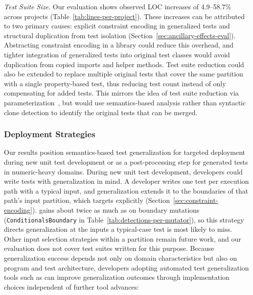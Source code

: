 \textit{Test Suite Size.}
Our evaluation shows observed LOC increases of 4.9--58.7\% across projects
(Table~\ref{tab:lines-per-project}).
These increases can be attributed to two primary causes:
explicit constraint encoding in generalized tests
and structural duplication from test isolation
(Section~\ref{sec:ancillary-effects-eval}).
Abstracting constraint encoding in a library
could reduce this overhead,
and tighter integration of generalized tests into original test classes
would avoid duplication from copied imports and helper methods.
Test suite reduction could also be extended
to replace multiple original tests that cover the same partition
with a single property-based test,
thus reducing test count instead of only compensating for added tests.
This mirrors the idea of test suite reduction via
parameterization~\cite{tsukamoto_2018_autoput,azamnouri_2021_compressing},
but would use semantics-based analysis rather than syntactic clone detection
to identify the original tests that can be merged.

\subsubsection{Deployment Strategies}

Our results position semantics-based test generalization
for targeted deployment during new unit test development
or as a post-processing step for generated tests in numeric-heavy domains.
During new unit test development,
developers could write tests with generalization in mind.
A developer writes one test per execution path with a typical input,
and generalization extends it to the boundaries of that path's input partition,
which \VariantImproved{} targets explicitly (Section~\ref{sec:constraint-encoding}).
\VariantImprovedC{} gains about twice as much as \VariantNaiveC{} on boundary mutations
(\texttt{ConditionalsBoundary} in Table~\ref{tab:detections-per-mutator}),
so this strategy directs generalization at the inputs a typical-case test is most likely to miss.
Other input selection strategies within a partition remain future work,
and our evaluation does not cover test suites written for this purpose.
Because generalization success depends not only on domain characteristics
but also on program and test architecture,
developers adopting automated test generalization tools
such as \ToolTeralizer{} can improve generalization outcomes
through implementation choices independent of further tool advances:

